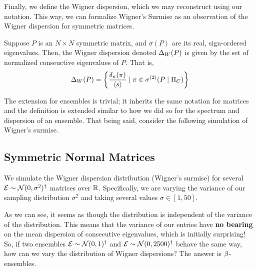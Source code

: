 Finally, we define the Wigner dispersion, which we may reconstruct using our notation. This way, we can formalize Wigner's Surmise as
an observation of the Wigner dispersion for symmetric matrices.

\begin{definition}
Suppose $P$ is an $N \times N$ symmetric matrix, and $\sigma(P)$ are its real, sign-ordered eigenvalues.
Then, the Wigner dispersion denoted $\Delta_{W}(P)$ is given by the set of normalized conseuctive eigenvalues of $P$. That is,
$$ \Delta_{W}(P) = \left\{ \frac{\delta_n(\pi)}{{\langle s \rangle}} \mid \pi \in {\sigma^{(2)}}(P \mid \Pi_C) \right\} $$
\end{definition}

The extension for ensembles is trivial; it inherits the same notation for matrices and the definition is extended similar to how we
did so for the spectrum and dispersion of an ensemble. That being said, consider the following simulation of Wigner's surmise.

\newpage


\subsection{Symmetric Normal Matrices}

We simulate the Wigner dispersion distribution (Wigner's surmise) for several $\mathcal{E} \sim \mathcal{N}(0, \sigma^2)^\dagger$ matrices over $\mathbb{R}$.
Specifically, we are varying the variance of our sampling distribution $\sigma^2$ and taking several values $\sigma \in  [1, 50]$.



As we can see, it seems as though the distribution is independent of the variance of the distribution.
This means that the variance of our entries have \textbf{no bearing} on the mean dispersion of consecutive eigenvalues, which is initially surprising!
So, if two ensembles $\mathcal{E} \sim \mathcal{N}(0,1)^\dagger$ and $\mathcal{E} \sim \mathcal{N}(0,2500)^\dagger$ behave the same way, how can we vary the distribution of Wigner dispersions?
The answer is $\beta$-ensembles. \newline

